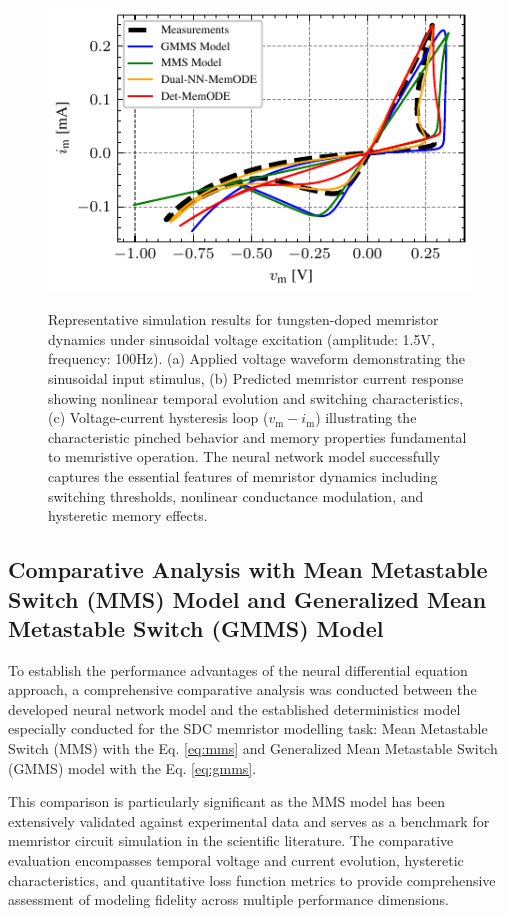 \documentclass[lettersize,journal]{IEEEtran}
\begin{document}
\begin{figure}[!t]
{    \includegraphics[width=\subwidth]{sample_results/sol_plots_amp_1.5_freq_100.0_fig_2.pdf}%
  }
  \caption{Representative simulation results for tungsten-doped memristor dynamics under sinusoidal voltage excitation (amplitude: 1.5V, frequency: 100Hz). (a) Applied voltage waveform demonstrating the sinusoidal input stimulus, (b) Predicted memristor current response showing nonlinear temporal evolution and switching characteristics, (c) Voltage-current hysteresis loop (\(v_{\mathrm{m}} - i_{\mathrm{m}}\)) illustrating the characteristic pinched behavior and memory properties fundamental to memristive operation. The neural network model successfully captures the essential features of memristor dynamics including switching thresholds, nonlinear conductance modulation, and hysteretic memory effects.}
  \label{fig:sample-results}
\end{figure}


\subsection{Comparative Analysis with Mean Metastable Switch (MMS) Model and Generalized Mean Metastable Switch (GMMS) Model}

\noindent
To establish the performance advantages of the neural differential equation approach, a comprehensive comparative analysis was conducted between the developed neural network model and the established deterministics model especially conducted for the SDC memristor modelling task: Mean Metastable Switch (MMS) with the Eq. \eqref{eq:mms} and Generalized Mean Metastable Switch (GMMS) model with the Eq. \eqref{eq:gmms}.

This comparison is particularly significant as the MMS model has been extensively validated against experimental data and serves as a benchmark for memristor circuit simulation in the scientific literature. The comparative evaluation encompasses temporal voltage and current evolution, hysteretic characteristics, and quantitative loss function metrics to provide comprehensive assessment of modeling fidelity across multiple performance dimensions.
\end{document}
